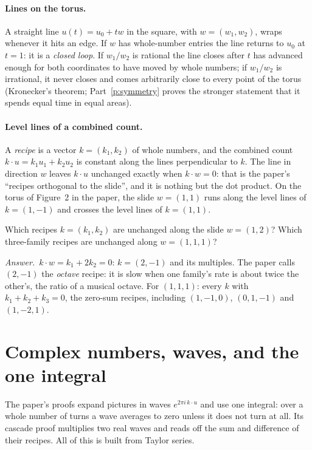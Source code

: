 \documentclass[10pt]{article}
\theoremstyle{plain}
\theoremstyle{definition}
\newcommand{\answer}{\par\smallskip\noindent\textit{Answer.}\ }
\begin{document}
\paragraph{Lines on the torus.}
A straight line $u(t)=u_0+tw$ in the square, with $w=(w_1,w_2)$, wraps
whenever it hits an edge. If $w$ has whole-number entries the line returns
to $u_0$ at $t=1$: it is a \emph{closed loop}. If $w_1/w_2$ is rational the
line closes after $t$ has advanced enough for both coordinates to have moved
by whole numbers; if $w_1/w_2$ is irrational, it never closes and comes
arbitrarily close to every point of the torus (Kronecker's theorem;
Part~\ref{p:symmetry} proves the stronger statement that it spends equal
time in equal areas).

\paragraph{Level lines of a combined count.}
A \emph{recipe} is a vector $k=(k_1,k_2)$ of whole numbers, and the
combined count $k\cdot u=k_1u_1+k_2u_2$ is constant along the lines
perpendicular to $k$. The line in direction $w$ leaves $k\cdot u$ unchanged
exactly when $k\cdot w=0$: that is the paper's ``recipes orthogonal to the
slide'', and it is nothing but the dot product. On the torus of Figure~2 in
the paper, the slide $w=(1,1)$ runs along the level lines of $k=(1,-1)$ and
crosses the level lines of $k=(1,1)$.

\begin{checkyourself}
Which recipes $k=(k_1,k_2)$ are unchanged along the slide $w=(1,2)$? Which
three-family recipes are unchanged along $w=(1,1,1)$?
\answer $k\cdot w=k_1+2k_2=0$: $k=(2,-1)$ and its multiples. The paper calls
$(2,-1)$ the \emph{octave} recipe: it is slow when one family's rate is
about twice the other's, the ratio of a musical octave. For $(1,1,1)$: every
$k$ with $k_1+k_2+k_3=0$, the zero-sum recipes, including $(1,-1,0)$,
$(0,1,-1)$ and $(1,-2,1)$.
\end{checkyourself}

\section{Complex numbers, waves, and the one integral}
\label{p:waves}

\begin{why}
The paper's proofs expand pictures in waves $e^{2\pi i\,k\cdot u}$ and use
one integral: over a whole number of turns a wave averages to zero unless
it does not turn at all. Its cascade proof multiplies two real waves and
reads off the sum and difference of their recipes. All of this is built
from Taylor series.
\end{why}
\end{document}
